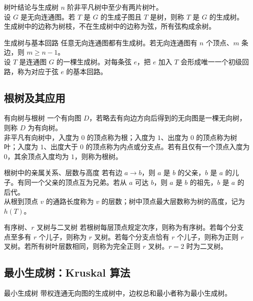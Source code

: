 \documentclass[UTF8,zihao=-4]{ctexart}
\begin{document}
\begin{corebox}{树叶结论与生成树}
$n$ 阶非平凡树中至少有两片树叶。\\
设 $G$ 是无向连通图。若 $T$ 是 $G$ 的生成子图且 $T$ 是树，则称 $T$ 是 $G$ 的生成树。生成树中的边称为树枝，不在生成树中的边称为弦，所有弦构成余树。
\end{corebox}

\begin{corebox}{生成树与基本回路}
任意无向连通图都有生成树。若无向连通图有 $n$ 个顶点、$m$ 条边，则 $m\ge n-1$。\\
设 $T$ 是连通图 $G$ 的一棵生成树。对每条弦 $e$，把 $e$ 加入 $T$ 会形成唯一一个初级回路，称为对应于弦 $e$ 的基本回路。
\end{corebox}

\subsection{根树及其应用}

\begin{corebox}{有向树与根树}
一个有向图 $D$，若略去有向边方向后得到的无向图是一棵无向树，则称 $D$ 为有向树。\\
非平凡有向树中，入度为 $0$ 的顶点称为根；入度为 $1$、出度为 $0$ 的顶点称为树叶；入度为 $1$、出度大于 $0$ 的顶点称为内点或分支点。若有且仅有一个顶点入度为 $0$，其余顶点入度均为 $1$，则称为根树。
\end{corebox}

\begin{corebox}{根树中的亲属关系、层数与高度}
若有边 $a\to b$，则 $a$ 是 $b$ 的父亲，$b$ 是 $a$ 的儿子。有同一个父亲的顶点互为兄弟。若从 $a$ 可达 $b$，则 $a$ 是 $b$ 的祖先，$b$ 是 $a$ 的后代。\\
从根到顶点 $v$ 的通路长度称为 $v$ 的层数；树中顶点最大层数称为树的高度，记为 $h(T)$。
\end{corebox}

\begin{corebox}{有序树、$r$ 叉树与二叉树}
若根树每层顶点规定次序，则称为有序树。若每个分支点至多有 $r$ 个儿子，则称为 $r$ 叉树。若每个分支点恰有 $r$ 个儿子，则称为正则 $r$ 叉树。若所有树叶层数相同，则称为完全正则 $r$ 叉树。$r=2$ 时为二叉树。
\end{corebox}

\subsection{最小生成树：Kruskal 算法}

\begin{corebox}{最小生成树}
带权连通无向图的生成树中，边权总和最小者称为最小生成树。
\end{corebox}
\end{document}
